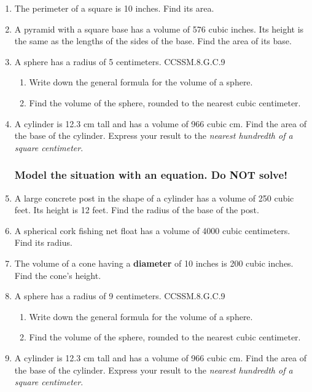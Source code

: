 \begin{enumerate}
\item The perimeter of a square is 10 inches. Find its area. \vspace{4cm}

\item A pyramid with a square base has a volume of 576 cubic inches. Its height is the same as the lengths of the sides of the base. Find the area of its base.

\item A sphere has a radius of 5 centimeters. \hfill CCSSM.8.G.C.9
\begin{enumerate}
  \item Write down the general formula for the volume of a sphere. \vspace{1cm}
  \item Find the volume of the sphere, rounded to the nearest cubic centimeter.
\end{enumerate}  \vspace{3cm}

\item A cylinder is 12.3 cm tall and has a volume of 966 cubic cm. Find the area of the base of the cylinder. Express your result to the \emph{nearest hundredth of a square centimeter}. \vspace{3cm}

\subsubsection*{Model the situation with an equation. \hfill Do NOT solve!}
\item A large concrete post in the shape of a cylinder has a volume of 250 cubic feet. Its height is 12 feet. Find the radius of the base of the post. \vspace{2cm}

\item A spherical cork fishing net float has a volume of 4000 cubic centimeters. Find its radius. \vspace{2cm}

\item The volume of a cone having a \textbf{diameter} of 10 inches is 200 cubic inches. Find the cone's height.
  

\item A sphere has a radius of 9 centimeters. \hfill CCSSM.8.G.C.9
\begin{enumerate}
  \item Write down the general formula for the volume of a sphere. \vspace{1cm}
  \item Find the volume of the sphere, rounded to the nearest cubic centimeter.
\end{enumerate}  \vspace{3cm}

\item A cylinder is 12.3 cm tall and has a volume of 966 cubic cm. Find the area of the base of the cylinder. Express your result to the \emph{nearest hundredth of a square centimeter}. \vspace{3cm}



\end{enumerate}

